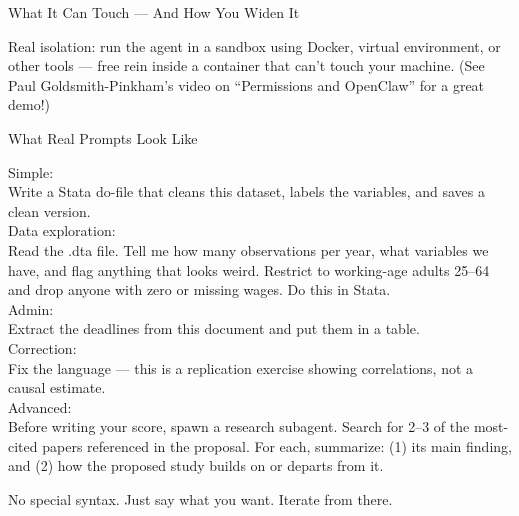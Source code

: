 \documentclass[aspectratio=169, 10pt]{beamer}
\begin{document}
\begin{frame}{What It Can Touch --- And How You Widen It}
\vfill
\begin{tcolorbox}[advancedbox]
\scriptsize Real isolation: run the agent in a sandbox using Docker, virtual environment, or other tools --- free rein inside a container that can't touch your machine. (See Paul Goldsmith-Pinkham's video on ``Permissions and OpenClaw'' for a great demo!)
\end{tcolorbox}
\end{frame}




\begin{frame}[fragile]{What Real Prompts Look Like}
\begin{tcolorbox}[colback=DarkSlate, colframe=DarkSlate, arc=3pt, left=6pt, right=6pt, top=3pt, bottom=3pt]
{\color{CoolGray}\ttfamily\tiny Simple:\color{white}\tiny\\
Write a Stata do-file that cleans this dataset, labels the variables, and saves a clean version.\\[3pt]
\color{CoolGray}\tiny Data exploration:\color{white}\tiny\\
Read the .dta file. Tell me how many observations per year, what variables we have, and flag anything that looks weird. Restrict to working-age adults 25--64 and drop anyone with zero or missing wages. Do this in Stata.\\[3pt]
\color{CoolGray}\tiny Admin:\color{white}\tiny\\
Extract the deadlines from this document and put them in a table.\\[3pt]
\color{CoolGray}\tiny Correction:\color{white}\tiny\\
Fix the language --- this is a replication exercise showing correlations, not a causal estimate.\\[3pt]
\color{CoolGray}\tiny Advanced:\color{white}\tiny\\
Before writing your score, spawn a research subagent. Search for 2--3 of the most-cited papers referenced in the proposal. For each, summarize: (1) its main finding, and (2) how the proposed study builds on or departs from it.
}
\end{tcolorbox}
\vskip2pt
{\small\color{CoolGray} No special syntax. Just say what you want. Iterate from there.}
\end{frame}
\end{document}

